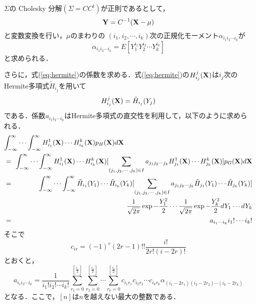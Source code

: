 $\Sigma$の Cholesky 分解$(\Sigma=CC^{t})$が正則であるとして，
\begin{equation}
 {\bf Y} = C^{-1}( {\bf X} - \mu)
\end{equation}
と変数変換を行い，$\mu$のまわりの $(i_{1},i_{2}, \cdots ,i_{k})$次の正規化モーメント$\alpha_{i_{1}i_{2} \cdots i_{k}}$が
\begin{equation}
 \alpha_{i_{1}i_{2} \cdots i_{k}}=
   E[Y_{1}^{i_{1}}Y_{2}^{i_{2}} \cdots Y_{k}^{i_{k}}]
\end{equation}
と求められる．

さらに，式(\ref{eq:hermite})の係数を求める．式(\ref{eq:hermite})の$H^{j}_{i_{j}}({\bf X})$は$i_{j}$次のHermite多項式$\tilde{H}_{i_{j}}$を用いて
\begin{equation}
 H^{j}_{i_{j}}({\bf X})=\tilde{H}_{i_{j}}(Y_{j})
\end{equation}
である．係数$a_{i_{1}i_{2} \cdots i_{k}}$はHermite多項式の直交性を利用して，以下のように求められる．
\begin{eqnarray}
 \lefteqn{
  \int_{-\infty}^{\infty} \cdots \int_{-\infty}^{\infty}
  H^{1}_{i_{1}}({\bf X}) \cdots H^{k}_{i_{k}}({\bf X})
  p_{H}({\bf X})d{\bf X}
 } \nonumber \\
 &=&\!\!\int_{-\infty}^{\infty} \cdots \int_{-\infty}^{\infty}
  H^{1}_{i_{1}}({\bf X}) \cdots H^{k}_{i_{k}}({\bf X})
  [\sum_{(j_{1},j_{2},\cdots,j_{k})\in I}a_{j_{1}j_{2} \cdots j_{k}}
   H^{1}_{j_{1}}({\bf X}) \cdots H^{k}_{j_{k}}({\bf X})]
   p_{G}({\bf X})d{\bf X} \nonumber \\
 &=&\!\!\int_{-\infty}^{\infty} \cdots \int_{-\infty}^{\infty}
  \tilde{H}_{i_{1}}(Y_{1}) \cdots \tilde{H}_{i_{k}}(Y_{k}) \nonumber
  [\sum_{(j_{1},j_{2},\cdots,j_{k})\in I} a_{j_{1}j_{2} \cdots j_{k}}
  \tilde{H}_{j_{1}}(Y_{1}) \cdots \tilde{H}_{j_{k}}(Y_{k})] \nonumber \\
 & &\!\!\frac{1}{\sqrt{2\pi}}\exp{-\frac{Y_{1}^{2}}{2}} \cdots
  \frac{1}{\sqrt{2\pi}}\exp{-\frac{Y_{k}^{2}}{2}}
  dY_{1} \cdots dY_{k} \nonumber \\
 &=&\!\!a_{i_{1}\cdots i_{k}}i_{1}! \cdots i_{k}!
\end{eqnarray}
そこで
\begin{equation}
 c_{ir}=(-1)^{r}(2r-1)!! \frac{i!}{2r!(i-2r)!}
\end{equation}
とおくと，
\begin{equation}
 a_{i_{1}i_{2} \cdots i_{k}}
 =\frac{1}{i_{1}!i_{2}! \cdots i_{k}!}
  \sum_{r_{1}=0}^{[\frac{i_{1}}{2}]}
  \sum_{r_{2}=0}^{[\frac{i_{2}}{2}]} \cdots
  \sum_{r_{k}=0}^{[\frac{i_{k}}{2}]}
  c_{i_{1}r_{1}}c_{i_{2}r_{2}} \cdots c_{i_{k}r_{k}}
  \alpha_{(i_{1}-2r_{1})(i_{2}-2r_{2}) \cdots (i_{k}-2r_{k})}
\end{equation}
となる．ここで，$[n]$は$n$を越えない最大の整数である．

